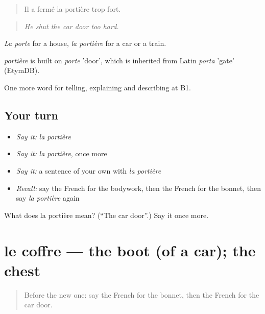 \begin{quote}
Il a fermé la portière trop fort.
\end{quote}

\begin{quote}
\emph{He shut the car door too hard.}
\end{quote}

\emph{La porte} for a house, \emph{la portière} for a car or a train.

\begin{cousinweb}
\emph{portière} is built on \emph{porte} 'door', which is inherited from Latin \emph{porta} 'gate' (EtymDB).
\end{cousinweb}

\begin{grammarlens}[title={What you've built}]
One more word for telling, explaining and describing at B1.
\end{grammarlens}

\subsection*{Your turn}
\begin{itemize}
\raggedright
  \item \emph{Say it:} \emph{la portière}
  \item \emph{Say it:} \emph{la portière}, once more
  \item \emph{Say it:} a sentence of your own with \emph{la portière}
  \item \emph{Recall:} say the French for the bodywork, then the French for the bonnet, then say \emph{la portière} again
\end{itemize}

\begin{tcolorbox}[breakable,colback=teal!4,colframe=teal!35!black,title={Before you move on}]
What does la portière mean? (\textquotedblleft{}The car door\textquotedblright{}.) Say it once more.
\end{tcolorbox}
\section[le coffre]{le coffre — the boot (of a car); the chest}

\label{lesson:FR-C406-coffre}



\begin{quote}
Before the new one: say the French for the bonnet, then the French for the car door.
\end{quote}

